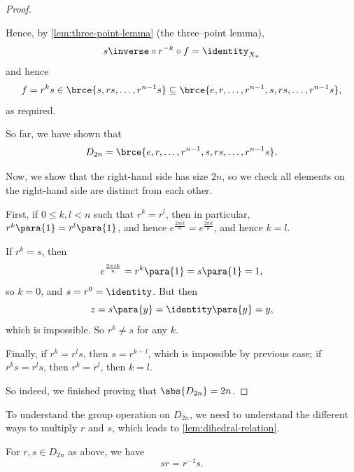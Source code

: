 \begin{proof}
\begin{enumerate}
        Hence, by \autoref{lem:three-point-lemma} (the three--point lemma),
        \[
            s\inverse \circ r^{-k} \circ f = \identity_{X_n}
        \]
        and hence
        \[
            f = r^k s \in \brce{s, rs, \ldots, r^{n - 1}s} \subseteq \brce{e, r, \ldots, r^{n - 1}, s, rs, \ldots, r^{n - 1}s},
        \]
        as required.
    \end{enumerate}

    So far, we have shown that
    \[
        D_{2n} = \brce{e, r, \ldots, r^{n - 1}, s, rs, \ldots, r^{n - 1}s}.
    \]

    Now, we show that the right-hand side has size \(2n\), so we check all elements on the right-hand side are distinct from each other.

    First, if \(0 \leq k, l < n\) such that \(r^k = r^l\), then in particular, \(r^k \para{1} = r^l \para{1}\), and hence \(e^{\frac{2 \pi i k}{n}} = e^{\frac{2 \pi i l}{n}}\), and hence \(k = l\).

    If \(r^{k} = s\), then
    \[
        e^{\frac{2 \pi i k}{n}} = r^{k} \para{1} = s \para{1} = 1,
    \]
    so \(k = 0\), and \(s = r^{0} = \identity\). But then
    \[
        z = s\para{y} = \identity\para{y} = y,
    \]
    which is impossible. So \(r^{k} \neq s\) for any \(k\).

    Finally, if \(r^{k} = r^{l} s\), then \(s = r^{k - l}\), which is impossible by previous case; if \(r^{k} s = r^{l} s\), then \(r^{k} = r^{l}\), then \(k = l\).

    So indeed, we finished proving that \(\abs{D_{2n}} = 2n\).
\end{proof}

To understand the group operation on \(D_{2n}\), we need to understand the different ways to multiply \(r\) and \(s\), which leads to \autoref{lem:dihedral-relation}.

\begin{lemma}
    \label{lem:dihedral-relation}%
    For \(r, s \in D_{2n}\) as above, we have
    \[
        s r = r^{-1} s.
    \]
\end{lemma}

